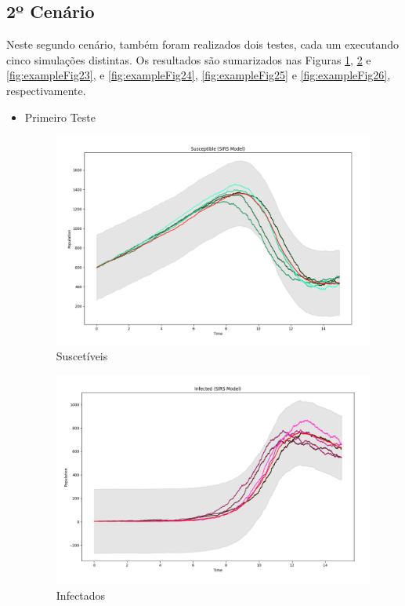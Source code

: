 \documentclass[a4paper, 12pt]{article}
\begin{document}
\subsection*{2º Cenário}

Neste segundo cenário, também foram realizados dois testes, cada um executando cinco simulações distintas. Os resultados são sumarizados nas Figuras \ref{fig:exampleFig21}, \ref{fig:exampleFig22} e \ref{fig:exampleFig23}, e \ref{fig:exampleFig24}, \ref{fig:exampleFig25} e \ref{fig:exampleFig26}, respectivamente.

\begin{itemize}
    \item Primeiro Teste
    \begin{figure}[H]
        \centering
        \includegraphics[width=1\textwidth]{Images/Exercise 5/Scenario 2/s2a.png}
        \vspace*{-1cm}
        \caption{Suscetíveis}
        \label{fig:exampleFig21}
    \end{figure}
    
    \begin{figure}[H]
        \centering
        \includegraphics[width=1\textwidth]{Images/Exercise 5/Scenario 2/i2a.png}
        \vspace*{-1cm}
        \caption{Infectados}
        \label{fig:exampleFig22}
    \end{figure}
    

\end{itemize}
\end{document}

